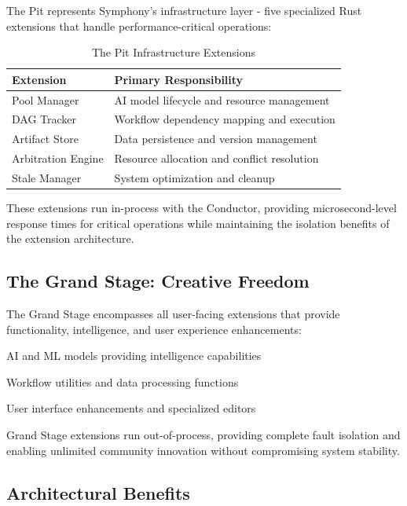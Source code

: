\textcolor{brandSecondary}{The Pit} represents Symphony's infrastructure layer - five specialized Rust extensions that handle performance-critical operations:

\begin{table}[ht]
\centering
\begin{tabular}{@{}ll@{}}
\toprule
\textbf{Extension} & \textbf{Primary Responsibility} \\
\midrule
Pool Manager & AI model lifecycle and resource management \\
DAG Tracker & Workflow dependency mapping and execution \\
Artifact Store & Data persistence and version management \\
Arbitration Engine & Resource allocation and conflict resolution \\
Stale Manager & System optimization and cleanup \\
\bottomrule
\end{tabular}
\caption{The Pit Infrastructure Extensions}
\end{table}

These extensions run in-process with the Conductor, providing microsecond-level response times for critical operations while maintaining the isolation benefits of the extension architecture.

\subsection*{The Grand Stage: Creative Freedom}

\textcolor{brandAccent}{The Grand Stage} encompasses all user-facing extensions that provide functionality, intelligence, and user experience enhancements:

\begin{description}[leftmargin=3cm,labelwidth=2.5cm]
    \item[\textbf{Instruments}] AI and ML models providing intelligence capabilities
    \item[\textbf{Operators}] Workflow utilities and data processing functions
    \item[\textbf{Motifs}] User interface enhancements and specialized editors
\end{description}

Grand Stage extensions run out-of-process, providing complete fault isolation and enabling unlimited community innovation without compromising system stability.

\subsection*{Architectural Benefits}


